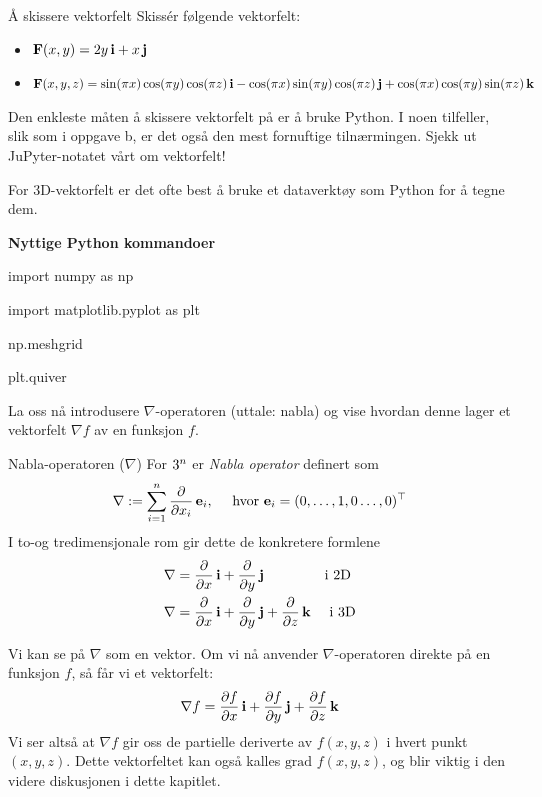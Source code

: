 \begin{eks}{Å skissere vektorfelt}
Skissér følgende vektorfelt:
\begin{itemize}
  \item[a)] $\mathbf{F}(x, y) = 2y\,\mathbf{i} + x\,\mathbf{j}$
  \item[b)] $\mathbf{F}(x, y, z) = \sin(\pi x)\cos(\pi y) \cos(\pi z)\,\mathbf{i} - \cos(\pi x)\sin(\pi y)\cos(\pi z)\,\mathbf{j} + \cos(\pi x) \cos(\pi y) \sin(\pi z)\,\mathbf{k}$
\end{itemize}
Den enkleste måten å skissere vektorfelt på er å bruke Python. I noen tilfeller, slik som i oppgave b, er det også den mest fornuftige tilnærmingen. Sjekk ut JuPyter-notatet vårt om vektorfelt! 
\end{eks}
For 3D-vektorfelt er det ofte best å bruke et dataverktøy som Python for å tegne dem. 
\begin{minipage}{\columnwidth}
\begin{oppsum}{\textbf{Nyttige Python kommandoer}}
\begin{minipage}{.9\columnwidth}
\begin{lst}{}
import numpy as np

import matplotlib.pyplot as plt

np.meshgrid

plt.quiver
\end{lst}
\end{minipage}
\end{oppsum}
\end{minipage}
La oss nå introdusere $\nabla$-operatoren (uttale: nabla) og vise hvordan denne lager et vektorfelt $\nabla f$ av en funksjon $f$.

\begin{defn}{Nabla-operatoren ($\nabla$)} For $3^n$ er \emph{Nabla operator} definert som
\[\nabla := \sum_{i=1}^n \frac{\partial}{\partial x_i}\, \mathbf{e}_i , \quad \text{ hvor } \mathbf{e}_i = (0,\ldots, 1, 0\ldots, 0)^\top\]
I to-og tredimensjonale rom gir dette de konkretere formlene
\begin{align*}
\nabla &= \frac{\partial}{\partial x}\, \mathbf{i} + \frac{\partial}{\partial y}\, \mathbf{j} \qquad \qquad  \text{ i 2D}\\
\nabla &= \frac{\partial}{\partial x}\, \mathbf{i} + \frac{\partial}{\partial y}\, \mathbf{j} + \frac{\partial}{\partial z}\, \mathbf{k} \quad \text{ i 3D}
\end{align*}
\label{defn:nabla}
\end{defn}
Vi kan se på $\nabla$ som en vektor.  Om vi nå anvender $\nabla$-operatoren direkte på en funksjon $f$, så får vi et vektorfelt:
\[
\nabla f = \frac{\partial f}{\partial x}\, \mathbf{i} + \frac{\partial f}{\partial y}\, \mathbf{j} + \frac{\partial f}{\partial z}\, \mathbf{k}
\]
Vi ser altså at $\nabla f$ gir oss de partielle deriverte av \(f(x,y,z)\) i hvert punkt $(x,y,z)$. Dette vektorfeltet kan også kalles \(\text{grad } f (x,y,z)\), og blir viktig i den videre diskusjonen i dette kapitlet.

